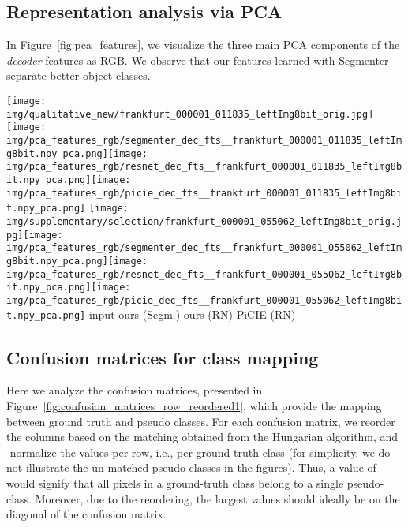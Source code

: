 \documentclass[runningheads]{llncs}
\begin{document}
\subsection{Representation analysis via PCA}

In Figure~\ref{fig:pca_features}, we visualize the three main PCA components of the \emph{decoder} features as RGB. We observe that our features learned with Segmenter separate better object classes.

\begin{figure*}[t!]
    \centering
    \texttt{[image: img/qualitative\_new/frankfurt\_000001\_011835\_leftImg8bit\_orig.jpg]}\texttt{[image: img/pca\_features\_rgb/segmenter\_dec\_fts\_\_frankfurt\_000001\_011835\_leftImg8bit.npy\_pca.png]}\texttt{[image: img/pca\_features\_rgb/resnet\_dec\_fts\_\_frankfurt\_000001\_011835\_leftImg8bit.npy\_pca.png]}\texttt{[image: img/pca\_features\_rgb/picie\_dec\_fts\_\_frankfurt\_000001\_011835\_leftImg8bit.npy\_pca.png]}
    \texttt{[image: img/supplementary/selection/frankfurt\_000001\_055062\_leftImg8bit\_orig.jpg]}\texttt{[image: img/pca\_features\_rgb/segmenter\_dec\_fts\_\_frankfurt\_000001\_055062\_leftImg8bit.npy\_pca.png]}\texttt{[image: img/pca\_features\_rgb/resnet\_dec\_fts\_\_frankfurt\_000001\_055062\_leftImg8bit.npy\_pca.png]}\texttt{[image: img/pca\_features\_rgb/picie\_dec\_fts\_\_frankfurt\_000001\_055062\_leftImg8bit.npy\_pca.png]}
    {
    \hspace*{0.6cm}
    {input}\hspace{1.6cm}
    {ours (Segm.)}\hspace{1.35cm}
    {ours (RN)}\hspace{1.35cm}
    {PiCIE (RN)}
    }
    \caption{\textbf{Feature visualization}. 
    We do PCA analysis of the pixel-wise decoder features from each image (independenly between the different images) and visualize the three first PCA components as an RGB image.
    `Segm.' stands for Segmenter with ViT-S/16 and `RN' for ResNet18+FPN.}
    \label{fig:pca_features}
\end{figure*}




\subsection{Confusion matrices for class mapping}
\label{sec:confusion}
Here we analyze the confusion matrices, presented in Figure~\ref{fig:confusion_matrices_row_reordered1}, which provide the mapping between ground truth and pseudo classes.
For each confusion matrix, we reorder the columns based on the matching obtained from the Hungarian algorithm, and -normalize the values per row, i.e., per ground-truth class (for simplicity, we do not illustrate the un-matched pseudo-classes in the figures).
Thus, a value of  would signify that all pixels in a ground-truth class belong to a single pseudo-class. 
Moreover, due to the reordering, the largest values should ideally be on the diagonal of the confusion matrix. 
\end{document}
